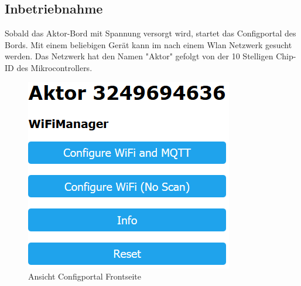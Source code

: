 \subsection{Inbetriebnahme}
Sobald das Aktor-Bord mit Spannung versorgt wird, startet das Configportal des Bords. Mit einem beliebigen Gerät kann im nach einem Wlan Netzwerk gesucht werden. Das Netzwerk hat den Namen "Aktor" gefolgt von der 10 Stelligen Chip-ID des Mikrocontrollers. 
 
\begin{figure}[H]
	\begin{center}
	\begin{minipage}[b]{.3\linewidth} %
		\includegraphics[width=\textwidth]{graphics/Configportal.PNG}
		\caption{Ansicht Configportal Frontseite}
	\end{minipage}
	\hspace{.1\linewidth}%
	\begin{minipage}[b]{.3\linewidth} %

\end{minipage}
\end{center}
\end{figure}
